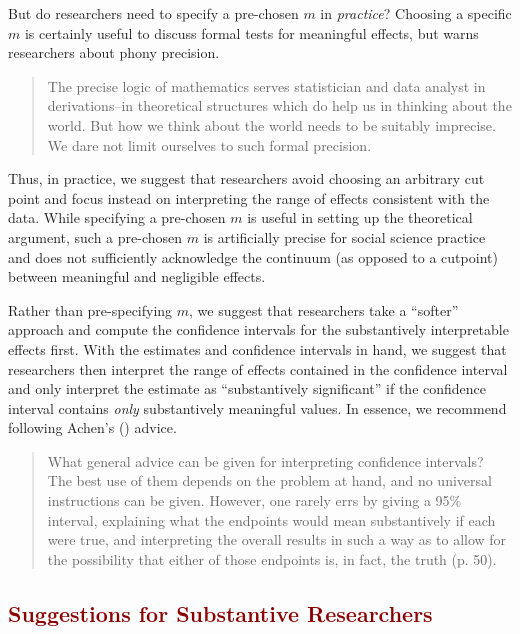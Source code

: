 \documentclass[12pt]{article}
\newcommand{\kelly}[1]{\textcolor{darkred}{#1}}
\begin{document}
But do researchers need to specify a pre-chosen $m$ in \emph{practice}? Choosing a specific $m$ is certainly useful to discuss formal tests for meaningful effects, but \citet[pp. 101-102]{Tukey1991} warns researchers about phony precision.

\begin{quote}
The precise logic of mathematics serves statistician and data analyst in derivations--in theoretical structures which do help us in thinking about the world. But how we think about the world needs to be suitably imprecise. We dare not limit ourselves to such formal precision.
\end{quote}

\noindent Thus, in practice, we suggest that researchers avoid choosing an arbitrary cut point and focus instead on interpreting the range of effects consistent with the data. While specifying a pre-chosen $m$ is useful in setting up the theoretical argument, such a pre-chosen $m$ is artificially precise for social science practice and does not sufficiently acknowledge the continuum (as opposed to a cutpoint) between meaningful and negligible effects.

Rather than pre-specifying $m$, we suggest that researchers take a ``softer'' approach and compute the confidence intervals for the substantively interpretable effects first. With the estimates and confidence intervals in hand, we suggest that researchers then interpret the range of effects contained in the confidence interval and only interpret the estimate as ``substantively significant'' if the confidence interval contains \emph{only} substantively meaningful values. In essence, we recommend following Achen's (\citeyear{Achen1982}) advice.

\begin{quote}
What general advice can be given for interpreting confidence intervals? The best use of them depends on the problem at hand, and no universal instructions can be given. However, one rarely errs by giving a 95\% interval, explaining what the endpoints would mean substantively if each were true, and interpreting the overall results in such a way as to allow for the possibility that either of those endpoints is, in fact, the truth (p. 50).
\end{quote}

\kelly{\section*{Suggestions for Substantive Researchers}}
\end{document}

